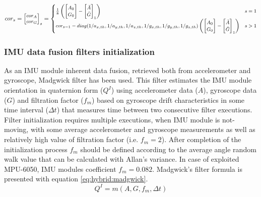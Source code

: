 \documentclass[sensors,article,submit,moreauthors,pdftex,10pt,a4paper]{mdpi}
\begin{document}
\begin{equation}
	\footnotesize
	cor_s = \begin{bmatrix}cor_A\\ cor_G\end{bmatrix}_s =
	\begin{cases}
		\frac{1}{8}\left(\begin{bmatrix}A_0                                                                          \\ G_0\end{bmatrix} - \begin{bmatrix}\bar{A}\\ \bar{G}\end{bmatrix}_1\right) & s = 1\\
		cor_{s-1} - diag(1/a_{x,th},1/a_{y,th},1/a_{z,th},1/g_{x,th},1/g_{y,th},1/g_{z,th}) \left(\begin{bmatrix}A_0 \\ G_0\end{bmatrix} - \begin{bmatrix}\bar{A}\\ \bar{G}\end{bmatrix}_1\right) & s > 1
	\end{cases}
	\label{eq:hybrid:IMUCalibration:2}
\end{equation}


\subsubsection{IMU data fusion filters initialization}
As an IMU module inherent data fusion, retrieved both from accelerometer and gyroscope, Madgwick filter \cite{Madgwick2011} has been used. This filter estimates the IMU module orientation in quaternion form ($Q^I$) using accelerometer data ($A$), gyroscope data ($G$) and filtration factor ($f_m$) based on gyroscope drift characteristics in some time interval ($\Delta t$) that measures time between two consecutive filter executions. Filter initialization requires multiple executions, when IMU module is not-moving, with some average accelerometer and gyroscope measurements as well as relatively high value of filtration factor (i.e. $f_m=2$). After completion of the initialization process $f_m$  should be defined according to the average angle random walk value that can be calculated with Allan’s variance. In case of exploited MPU-6050, IMU modules coefficient $f_m = 0.082$. Madgwick’s filter formula is presented with equation \ref{eq:hybrid:madgwick}.
\begin{equation}
	Q^I=m(A,G,f_m,\Delta t)
	\label{eq:hybrid:madgwick}
\end{equation}
\end{document}
